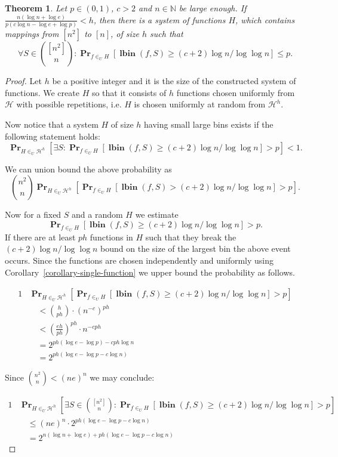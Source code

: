 \documentclass{article}
\newcommand{\lbin}[2]{\operatorname{\mathbf{lbin}}({#1}, {#2})}
\newcommand{\probs}[2]{\operatorname{\mathbf{Pr}}_{{#1}}\left[{#2}\right]}
\newtheorem{theorem}{Theorem}
\begin{document}
\begin{theorem}
\label{theorem-fixed-p-c}
Let $p \in (0, 1)$, $c > 2$ and $n \in \mathbb{N}$ be large enough. If $\frac{n(\log n + \log e)}{p(c \log n - \log e + \log{p})} < h$, then there is a system of functions $H$, which contains mappings from $[n^2]$ to $[n]$, of size $h$ such that 
\[
\forall S \in \binom{[n^2]}{n} \colon \probs{f \in_U H}{\lbin{f}{S} \geq (c + 2) \log n / \log \log n} \leq p.
\]
\end{theorem}
\begin{proof}
Let $h$ be a positive integer and it is the size of the constructed system of functions.
We create $H$ so that it consists of $h$ functions chosen uniformly from $\mathcal{H}$ with possible repetitions, i.e. $H$ is chosen uniformly at random from $\mathcal{H}^h$.

Now notice that a system $H$ of size $h$ having small large bins exists if the following statement holds:
\[
\probs{H \in_U \mathcal{H}^h}{\exists S \colon \probs{f \in_U H}{\lbin{f}{S} \geq (c + 2) \log n / \log \log n } > p} < 1.
\]

We can union bound the above probability as
\[
\binom{n^2}{n} \probs{H \in_U \mathcal{H}^h}{\probs{f \in_U H}{\lbin{f}{S} > (c + 2) \log n / \log \log n } > p}.
\]

Now for a fixed $S$ and a random $H$ we estimate \[\probs{f \in_U H}{\lbin{f}{S} \geq (c + 2) \log n / \log \log n } > p.\]
If there are at least $ph$ functions in $H$ such that they break the $(c + 2)\log n / \log \log n$ bound on the size of the largest bin the above event occurs. Since the functions are chosen independently and uniformly using Corollary~\ref{corollary-single-function} we upper bound the probability as follows.

\begin{alignat*}{1}
& \probs{H \in_U \mathcal{H}^h}{\probs{f \in_U H}{\lbin{f}{S} \geq (c + 2) \log n / \log \log n} > p} \\
	& \quad < \binom{h}{ph} \cdot \left(n^{-c}\right)^{ph} \\
	& \quad < \left(\frac{eh}{ph}\right)^{ph} \cdot n^{-cph} \\
	& \quad = 2^{ph(\log e - \log{p}) -cph \log n} \\
	& \quad = 2^{ph(\log e - \log{p} -c \log n)}
\end{alignat*}

Since $\binom{n^2}{n} < (ne)^n$ we may conclude:

\begin{alignat*}{1}
& \probs{H \in_U \mathcal{H}^h}{\exists S \in \binom{[n^2]}{n} \colon \probs{f \in_U H}{\lbin{f}{S} \geq (c + 2) \log n / \log \log n} > p} \\ 
	& \quad \leq (ne)^n \cdot 2^{ph(\log e - \log{p} -c \log n)} \\
	& \quad = 2^{n(\log n + \log e) + ph(\log e - \log{p} - c \log n)}
\end{alignat*}


\end{proof}
\end{document}

